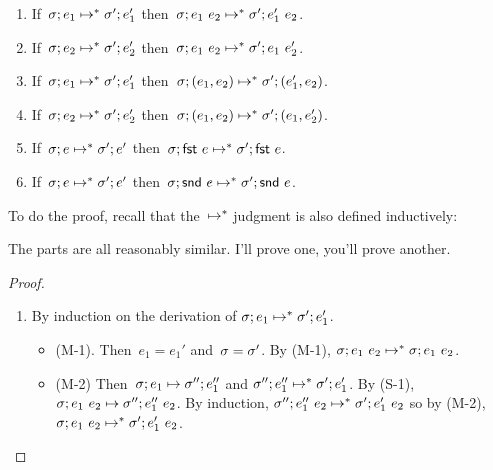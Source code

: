 \documentclass{article}
\begin{document}
\begin{lemma}\label{lem:compose-exps}
  \begin{enumerate}
  \item
    If~$\sigma; e_1 \mapsto^* \sigma'; e_1'$
    then~$\sigma; e_1~e_2 \mapsto^*
    \sigma'; e_1'~e_2$.
  \item
    If~$\sigma; e_2 \mapsto^* \sigma'; e_2'$
    then~$\sigma; e_1~e_2 \mapsto^*
    \sigma'; e_1~e_2'$.
  \item
    If~$\sigma; e_1 \mapsto^* \sigma'; e_1'$
    then~$\sigma; (e_1, e_2) \mapsto^*
    \sigma'; (e_1', e_2)$.
  \item
    If~$\sigma; e_2 \mapsto^* \sigma'; e_2'$
    then~$\sigma; (e_1, e_2) \mapsto^*
    \sigma'; (e_1, e_2')$.
  \item
    If~$\sigma; e \mapsto^* \sigma'; e'$
    then~$\sigma; \mathsf{fst}~e \mapsto^*
    \sigma'; \mathsf{fst}~e$.
  \item
    If~$\sigma; e \mapsto^* \sigma'; e'$
    then~$\sigma; \mathsf{snd}~e \mapsto^*
    \sigma'; \mathsf{snd}~e$.
  \end{enumerate}
\end{lemma}


To do the proof, recall that the~$\mapsto^*$ judgment is also defined
inductively:

{
  \centering
}

The parts are all reasonably similar.
I'll prove one, you'll prove another.

\begin{proof}
  \begin{enumerate}
  \item
    By induction on the derivation of
    $\sigma; e_1 \mapsto^* \sigma'; e_1'$.
    \begin{itemize}
    \item (M-1). Then~$e_1 = e_1'$ and~$\sigma = \sigma'$.
      By (M-1),
      $\sigma; e_1~e_2 \mapsto^*
      \sigma; e_1~e_2$.
    \item (M-2)
      Then~$\sigma; e_1 \mapsto \sigma''; e_1''$
      and $\sigma''; e_1'' \mapsto^* \sigma'; e_1'$.
      By (S-1),
      $\sigma; e_1~e_2 \mapsto \sigma''; e_1''~e_2$.
      By induction,
      $\sigma''; e_1''~e_2 \mapsto^* \sigma'; e_1'~e_2$
      so by (M-2),
      $\sigma; e_1~e_2 \mapsto^* \sigma'; e_1'~e_2$.
    \end{itemize}
  \end{enumerate}
\end{proof}
\end{document}
